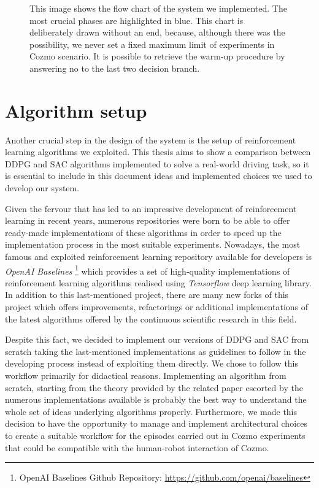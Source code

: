 \begin{figure}
{\begin{tikzpicture}[x=0.75pt,y=0.75pt,yscale=-1,xscale=1]
    \end{tikzpicture}

    }
    \caption[Cozmo algorithm flow chart]{This image shows the flow chart of the system we implemented. The most crucial phases are highlighted in blue. This chart is deliberately drawn without an end, because, although there was the possibility, we never set a fixed maximum limit of experiments in Cozmo scenario. It is possible to retrieve the warm-up procedure by answering no to the last two decision branch.}
    \label{fig:system-flow-chart}
\end{figure}

\section{Algorithm setup}

Another crucial step in the design of the system is the setup of reinforcement learning algorithms we exploited.
This thesis aims to show a comparison between DDPG and SAC algorithms implemented to solve a real-world driving task, so it is essential to include in this document ideas and implemented choices we used to develop our system.

Given the fervour that has led to an impressive development of reinforcement learning in recent years, numerous repositories were born to be able to offer ready-made implementations of these algorithms in order to speed up the implementation process in the most suitable experiments.
Nowadays, the most famous and exploited reinforcement learning repository available for developers is \textit{OpenAI Baselines} \footnote{OpenAI Baselines Github Repository: \href{https://github.com/openai/baselines}{https://github.com/openai/baselines}} which provides a set of high-quality implementations of reinforcement learning algorithms realised using \textit{Tensorflow} deep learning library.
In addition to this last-mentioned project, there are many new forks of this project which offers improvements, refactorings or additional implementations of the latest algorithms offered by the continuous scientific research in this field.

Despite this fact, we decided to implement our versions of DDPG and SAC from scratch taking the last-mentioned implementations as guidelines to follow in the developing process instead of exploiting them directly.
We chose to follow this workflow primarily for didactical reasons.
Implementing an algorithm from scratch, starting from the theory provided by the related paper escorted by the numerous implementations available is probably the best way to understand the whole set of ideas underlying algorithms properly.
Furthermore, we made this decision to have the opportunity to manage and implement architectural choices to create a suitable workflow for the episodes carried out in Cozmo experiments that could be compatible with the human-robot interaction of Cozmo.

